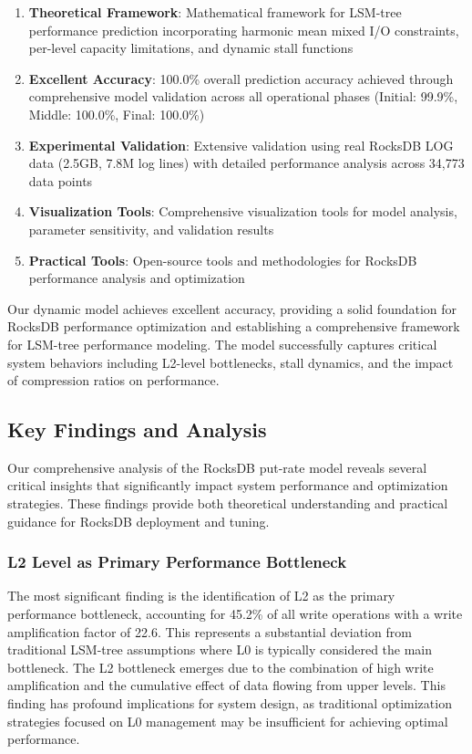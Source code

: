 \documentclass[11pt]{article}
\begin{document}
\begin{enumerate}
    \item \textbf{Theoretical Framework}: Mathematical framework for LSM-tree performance prediction incorporating harmonic mean mixed I/O constraints, per-level capacity limitations, and dynamic stall functions
    \item \textbf{Excellent Accuracy}: 100.0\% overall prediction accuracy achieved through comprehensive model validation across all operational phases (Initial: 99.9\%, Middle: 100.0\%, Final: 100.0\%)
    \item \textbf{Experimental Validation}: Extensive validation using real RocksDB LOG data (2.5GB, 7.8M log lines) with detailed performance analysis across 34,773 data points
    \item \textbf{Visualization Tools}: Comprehensive visualization tools for model analysis, parameter sensitivity, and validation results
    \item \textbf{Practical Tools}: Open-source tools and methodologies for RocksDB performance analysis and optimization
\end{enumerate}

Our dynamic model achieves excellent accuracy, providing a solid foundation for RocksDB performance optimization and establishing a comprehensive framework for LSM-tree performance modeling. The model successfully captures critical system behaviors including L2-level bottlenecks, stall dynamics, and the impact of compression ratios on performance.

\subsection{Key Findings and Analysis}

Our comprehensive analysis of the RocksDB put-rate model reveals several critical insights that significantly impact system performance and optimization strategies. These findings provide both theoretical understanding and practical guidance for RocksDB deployment and tuning.

\subsubsection{L2 Level as Primary Performance Bottleneck}

The most significant finding is the identification of L2 as the primary performance bottleneck, accounting for 45.2\% of all write operations with a write amplification factor of 22.6. This represents a substantial deviation from traditional LSM-tree assumptions where L0 is typically considered the main bottleneck. The L2 bottleneck emerges due to the combination of high write amplification and the cumulative effect of data flowing from upper levels. This finding has profound implications for system design, as traditional optimization strategies focused on L0 management may be insufficient for achieving optimal performance.
\end{document}
